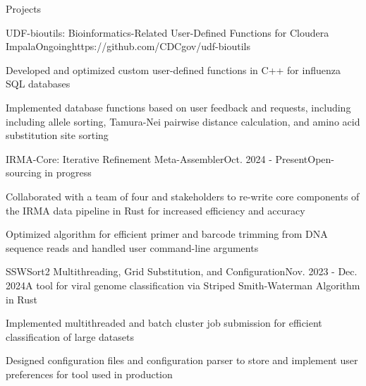 \documentclass{resume} %
\begin{document}
\begin{rSection}{Projects}
\itemsep -2pt


  \begin{rSubsection}{UDF-bioutils: Bioinformatics-Related User-Defined Functions for Cloudera Impala}{Ongoing}{https://github.com/CDCgov/udf-bioutils}{}
  \item Developed and optimized custom user-defined functions in C++ for influenza SQL databases
  \item Implemented database functions based on user feedback and requests, including including allele sorting, Tamura-Nei pairwise distance calculation, and amino acid substitution site sorting
  \end{rSubsection}

  \begin{rSubsection}{IRMA-Core: Iterative Refinement Meta-Assembler}{Oct. 2024 - Present}{Open-sourcing in progress}{}
  \item Collaborated with a team of four and stakeholders to re-write core components of the IRMA data pipeline in Rust for increased efficiency and accuracy
  \item Optimized algorithm for efficient primer and barcode trimming from DNA sequence reads and handled user command-line arguments
  \end{rSubsection}

  \pagebreak

  \begin{rSubsection}{SSWSort2 Multithreading, Grid Substitution, and Configuration}{Nov. 2023 - Dec. 2024}{A tool for viral genome classification via Striped Smith-Waterman Algorithm in Rust}{}
  \item Implemented multithreaded and batch cluster job submission for efficient classification of large datasets
  \item Designed configuration files and configuration parser to store and implement user preferences for tool used in production


\end{rSubsection}
\end{rSection}
\end{document}

